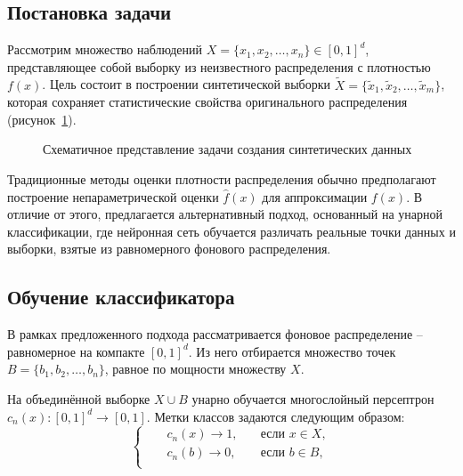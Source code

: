 \subsection{Постановка задачи}

Рассмотрим множество наблюдений \(X = \{x_1, x_2, \dots, x_n\} \in [0, 1]^d\), представляющее собой выборку из неизвестного распределения с плотностью \(f(x)\). Цель состоит в построении синтетической выборки \(\tilde{X} = \{\tilde{x}_1, \tilde{x}_2, \dots, \tilde{x}_m\}\), которая сохраняет статистические свойства оригинального распределения (рисунок~\cref{fig:synthetic_data_task}).

\begin{figure}[ht]
    \caption{Схематичное представление задачи создания синтетических данных}
    \label{fig:synthetic_data_task}
\end{figure}

Традиционные методы оценки плотности распределения обычно предполагают построение непараметрической оценки \(\hat{f}(x)\) для аппроксимации \(f(x)\). В отличие от этого, предлагается альтернативный подход, основанный на унарной классификации, где нейронная сеть обучается различать реальные точки данных и выборки, взятые из равномерного фонового распределения.

\subsection{Обучение классификатора}

В рамках предложенного подхода рассматривается фоновое распределение -- равномерное на компакте \([0, 1]^d\). Из него отбирается множество точек \(B = \{b_1, b_2, \dots, b_n\}\), равное по мощности множеству \(X\).

На объединённой выборке \(X \cup B\) унарно обучается многослойный персептрон \(c_n(x): [0, 1]^d \to [0, 1]\). Метки классов задаются следующим образом:
\[
\left\{
\begin{alignedat}{2}
    &&c_n(x) \rightarrow 1, \quad &\text{если } x \in X, \\
    &&c_n(b) \rightarrow 0, \quad &\text{если } b \in B, \\
\end{alignedat}
\right.
\]

